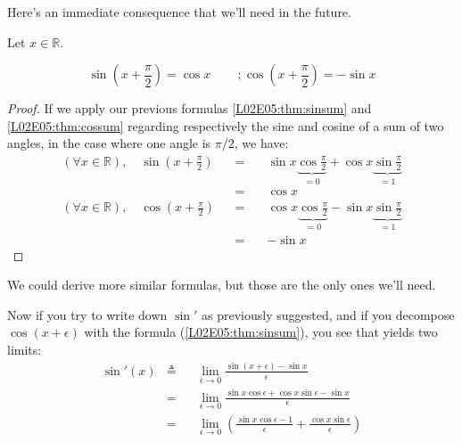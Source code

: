 \documentclass[solutions.tex]{subfiles}
\begin{document}
Here's an immediate consequence that we'll need in the future.
\begin{theorem}
Let $x\in\mathbb{R}$.

\[
	\boxed{\sin(x+\frac\pi2) = \cos x\,\qquad;
	\cos(x+\frac\pi2) = -\sin x}
	\label{L02E05:thm:trig-shift}
\]

\end{theorem}
\begin{proof}
If we apply our previous formulas \eqref{L02E05:thm:sinsum} and
\eqref{L02E05:thm:cossum} regarding respectively the sine and
cosine of a sum of two angles, in the case where one angle is
$\pi/2$, we have:
\begin{equation*} \begin{aligned}
	(\forall x\in\mathbb{R}),\quad \sin(x+\frac{\pi}2) &&=\quad&
		\sin x\underbrace{\cos\frac{\pi}{2}}_{=0}
		+\cos x\underbrace{\sin \frac{\pi}{2}}_{=1} \\
	~ &&=\quad& \boxed{\cos x} \\
	(\forall x\in\mathbb{R}),\quad \cos(x+\frac{\pi}2) &&=\quad&
		\cos x\underbrace{\cos\frac{\pi}{2}}_{=0}
		-\sin x\underbrace{\sin \frac{\pi}{2}}_{=1} \\
	~ &&=\quad& \boxed{-\sin x}
\end{aligned} \end{equation*}
\end{proof}
\begin{remark} We could derive more similar formulas, but
those are the only ones we'll need.
\end{remark}

\hrr

Now if you try to write down $\sin'$ as previously suggested,
and if you decompose $\cos(x+\epsilon)$ with the formula
(\ref{L02E05:thm:sinsum}), you see that yields two limits:
\begin{equation*} \begin{aligned}
	\sin'(x) &\triangleq&& \lim_{\epsilon \rightarrow 0}
		\frac{\sin(x+\epsilon)-\sin x}{\epsilon} \\
	~ &=&& \lim_{\epsilon \rightarrow 0}
		\frac{\sin x\cos\epsilon+\cos x\sin\epsilon-\sin x}{\epsilon} \\
	~ &=&& \lim_{\epsilon \rightarrow 0}\left(
		\frac{\sin x\cos\epsilon-1}{\epsilon}+\frac{\cos x\sin\epsilon}{\epsilon}
		\right) \\
\end{aligned} \end{equation*}
\end{document}
